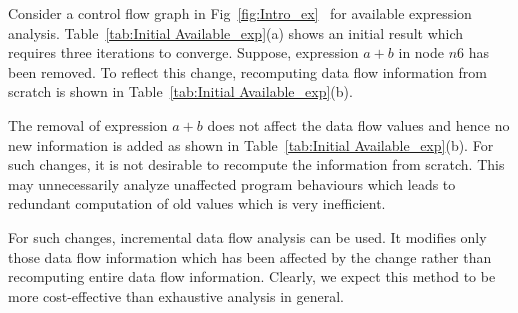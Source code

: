 \documentclass[11pt,a4paper,openright]{report}
\begin{document}
Consider a control flow graph in Fig~\ref{fig:Intro_ex}~\cite{thesis_r} for available expression analysis. Table~\ref{tab:Initial Available_exp}(a) shows 
an initial result which requires three iterations to converge. Suppose, expression $a+b$ in node $n6$ has been removed. To reflect this change, recomputing
data flow information from scratch is shown in Table~\ref{tab:Initial Available_exp}(b). 

The removal of expression $a+b$ does not affect the data flow values and hence no new information is added as shown in Table~\ref{tab:Initial Available_exp}(b).
For such changes, it is not desirable to recompute the information from scratch. This may unnecessarily analyze unaffected program behaviours which 
leads to redundant computation of old values which is very inefficient. 

For such changes, incremental data flow analysis can be used. It modifies only those data flow information which has been affected by 
the change rather than recomputing entire data flow information. Clearly, we expect this method to be more cost-effective than exhaustive analysis in general.
\end{document}
